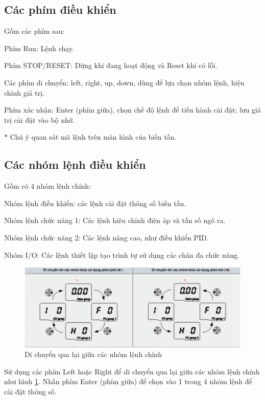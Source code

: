 \documentclass[13pt,a4paper]{extarticle}
\begin{document}
\subsection{Các phím điều khiển}
Gồm các phím sau:
\begin{list}{--}{}
\item Phím Run: Lệnh chạy.
\item Phím STOP/RESET: Dừng khi đang hoạt động và Reset khi có lỗi.
\item Các phím di chuyển: left, right, up, down, dùng để lựa chọn nhóm lệnh, hiệu chỉnh giá trị.
\item Phím xác nhận: Enter (phím giữa), chọn chế độ lệnh để tiến hành cài đặt; lưu giá trị cài đặt vào bộ nhớ.
\item[$\ast$] Chú ý quan sát mã lệnh trên màn hình của biến tần.
\end{list}
\subsection{Các nhóm lệnh điều khiển}
Gồm có 4 nhóm lệnh chính:
\begin{list}{--}{}
\item Nhóm lệnh điều khiển: các lệnh cài đặt thông số biến tần.
\item Nhóm lệnh chức năng 1: Các lệnh hiệu chỉnh điện áp và tần số ngõ ra.
\item Nhóm lệnh chức năng 2: Các lệnh nâng cao, như điều khiển PID.
\item Nhóm I/O: Các lệnh thiết lập tạo trình tự sử dụng các chân đa chức năng.
\end{list} 
\begin{figure}[!h]
\begin{center}
\includegraphics[scale=.5]{2}
\end{center}
\caption{Di chuyển qua lại giữa các nhóm lệnh chính}
\label{Fig:move-cmline}
\end{figure}
Sử dụng các phím Left hoặc Right để di chuyển qua lại giữa các nhóm lệnh chính như hình \ref{Fig:move-cmline}. Nhấn phím Enter (phím giữa) để chọn vào 1 trong 4 nhóm lệnh để cài đặt thông số.
\end{document}
